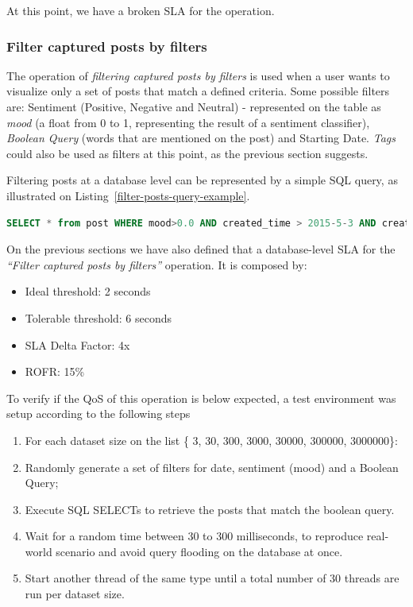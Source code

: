 At this point, we have a broken SLA for the operation.

\clearpage

\subsubsection{Filter captured posts by filters}
\label{filterposts}

The operation of \textit{filtering captured posts by filters} is used when a user wants to visualize only a set of posts that match a defined criteria. Some possible filters are: Sentiment (Positive, Negative and Neutral) - represented on the table as \textit{mood} (a float from 0 to 1, representing the result of a sentiment classifier), \textit{Boolean Query} (words that are mentioned on the post) and Starting Date. \textit{Tags} could also be used as filters at this point, as the previous section suggests. 

Filtering posts at a database level can be represented by a simple SQL query, as illustrated on Listing~\ref{filter-posts-query-example}.

\begin{lstlisting}[language=SQL,firstnumber=1, caption=Filter posts query - Example, label=filter-posts-query-example]
SELECT * from post WHERE mood>0.0 AND created_time > 2015-5-3 AND created_time < 2015-7-15 AND message like '%ruim%'
\end{lstlisting} 


On the previous sections we have also defined that a database-level SLA for the \textit{``Filter captured posts by filters''} operation. It is composed by: 

\begin{itemize}
	\item{Ideal threshold: 2 seconds}
	\item{Tolerable threshold: 6 seconds}
	\item{SLA Delta Factor: 4x}
	\item{ROFR: 15\%}
\end{itemize}

To verify if the QoS of this operation is below expected, a test environment was setup according to the following steps

\begin{enumerate}
\item{For each dataset size on the list \{ 3, 30, 300, 3000, 30000, 300000, 3000000\}:}
\item{Randomly generate a set of filters for date, sentiment (mood) and a Boolean Query;}
\item{Execute SQL SELECTs to retrieve the posts that match the boolean query.}
\item{Wait for a random time between 30 to 300 milliseconds, to reproduce real-world scenario and avoid	query flooding on the database at once.}
\item{Start another thread of the same type until a total number of 30 threads are run per dataset size.}
\end{enumerate}


